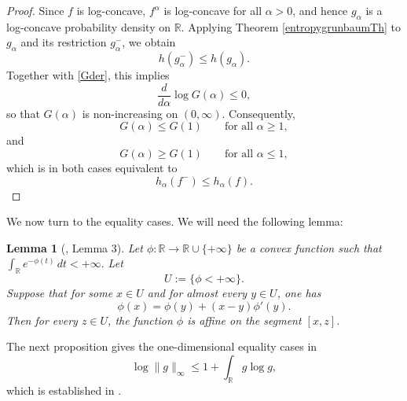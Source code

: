 \documentclass{article}
\theoremstyle{plain}
\newtheorem{lemma}[theorem]{Lemma}
\theoremstyle{definition}
\newcommand{\1}{\mathbf 1}
\begin{document}
\begin{proof}
Since $f$ is log-concave, $f^\alpha$ is log-concave for all $\alpha> 0$, and hence $g_\alpha$ is a log-concave probability density on $\mathbb R$.  
Applying Theorem \ref{entropygrunbaumTh} to $g_\alpha$ and its restriction $g_\alpha^-$, we obtain
\[
h(g_\alpha^-)\le h(g_\alpha).
\]
Together with \eqref{Gder}, this implies
\[
\frac{d}{d\alpha}\log G(\alpha)\le 0,
\]
so that $G(\alpha)$ is non-increasing on $(0,\infty)$.
Consequently,
\[
G(\alpha)\le G(1)\qquad\text{for all }\alpha\ge 1,
\]
and 
\[
G(\alpha)\geq G(1)\qquad\text{for all }\alpha\leq 1,
\]
which is in both cases equivalent to
\[
h_\alpha(f^-)\le h_\alpha(f).
\]
\end{proof}





We now turn to the equality cases. We will need the following lemma:
\begin{lemma}[\cite{santalo}, Lemma 3]
\label{lem:affine-rigidity}
Let $\phi:\mathbb{R}\to \mathbb{R}\cup\{+\infty\}$ be a convex function such that $
\int_{\mathbb{R}} e^{-\phi(t)}\,dt < +\infty.$
Let
\[
U:=\{\phi<+\infty\}.
\]
Suppose that for some $x\in U$ and for almost every $y\in U$, one has
\[
\phi(x)=\phi(y)+(x-y)\phi'(y).
\]
Then for every $z\in U$, the function $\phi$ is affine on the segment $[x,z]$.
\end{lemma}

The next proposition gives the one-dimensional equality cases in 
\begin{equation} \label{matthieu}
\log\|g\|_\infty \le 1+\int_{\mathbb R} g\log g,
\end{equation}
which is established in \cite[Proof of Theorem 7]{fradelizi2008increasing}.
\end{document}
